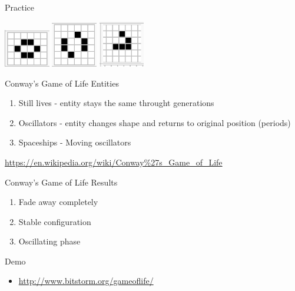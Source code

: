 \documentclass[bigger]{beamer}
\begin{document}
\begin{frame}[label=sec-16]{Practice}
\begin{center}
\includegraphics[width=2cm]{images/beehive.png}
\includegraphics[width=2cm]{images/toad.png}
\includegraphics[width=2cm]{images/glider.png}
\end{center}
\end{frame}
\begin{frame}[label=sec-17]{Conway's Game of Life Entities}
\begin{enumerate}
\item<1->Still lives - entity stays the same throught generations
\item<2->Oscillators - entity changes shape and returns to original position (periods)
\item<3->Spaceships - Moving oscillators
\end{enumerate}
\url{https://en.wikipedia.org/wiki/Conway\%27s_Game_of_Life}
\end{frame}
\begin{frame}[label=sec-18]{Conway's Game of Life Results}
\begin{enumerate}
\item<1->Fade away completely
\item<2->Stable configuration
\item<3->Oscillating phase
\end{enumerate}
\end{frame}
\begin{frame}[label=sec-19]{Demo}
\begin{itemize}
\item \url{http://www.bitstorm.org/gameoflife/}
\end{itemize}
\end{frame}
\end{document}
